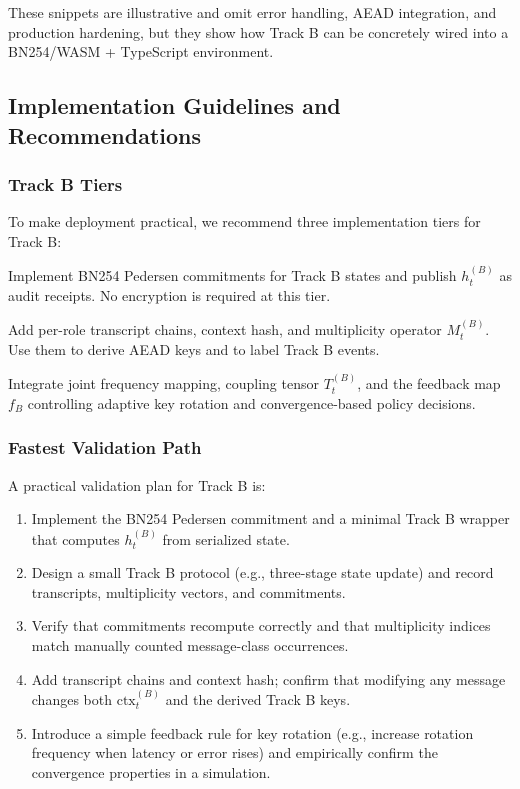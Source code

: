 \documentclass[11pt]{article}
\begin{document}
These snippets are illustrative and omit error handling, AEAD integration, and production hardening, but they show how Track B can be concretely wired into a BN254/WASM + TypeScript environment.

\subsection{Implementation Guidelines and Recommendations}

\subsubsection{Track B Tiers}

To make deployment practical, we recommend three implementation tiers for Track B:

\begin{description}[leftmargin=1.5em]
  \item[Tier 1: Commitment and receipts.] Implement BN254 Pedersen commitments for Track B states and publish \(h_t^{(B)}\) as audit receipts. No encryption is required at this tier.
  \item[Tier 2: Transcript and multiplicity binding.] Add per-role transcript chains, context hash, and multiplicity operator \(M_t^{(B)}\). Use them to derive AEAD keys and to label Track B events.
  \item[Tier 3: Full QSBS and feedback dynamics.] Integrate joint frequency mapping, coupling tensor \(T_t^{(B)}\), and the feedback map \(f_B\) controlling adaptive key rotation and convergence-based policy decisions.
\end{description}

\subsubsection{Fastest Validation Path}

A practical validation plan for Track B is:
\begin{enumerate}[leftmargin=1.5em]
  \item Implement the BN254 Pedersen commitment and a minimal Track B wrapper that computes \(h_t^{(B)}\) from serialized state.
  \item Design a small Track B protocol (e.g., three-stage state update) and record transcripts, multiplicity vectors, and commitments.
  \item Verify that commitments recompute correctly and that multiplicity indices match manually counted message-class occurrences.
  \item Add transcript chains and context hash; confirm that modifying any message changes both \(\mathrm{ctx}_t^{(B)}\) and the derived Track B keys.
  \item Introduce a simple feedback rule for key rotation (e.g., increase rotation frequency when latency or error rises) and empirically confirm the convergence properties in a simulation.
\end{enumerate}
\end{document}
